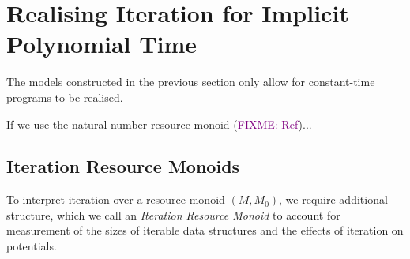 \documentclass[acmsmall,review]{acmart}
\newcommand{\bob}[1]{\textcolor{purple}{FIXME: #1}}
\begin{document}
\section{Realising Iteration for Implicit Polynomial Time}
\label{sec:realising-iteration}

The models constructed in the previous section only allow for
constant-time programs to be realised.

If we use the natural number resource monoid (\bob{Ref})...

\subsection{Iteration Resource Monoids}

To interpret iteration over a resource monoid $(M, M_0)$, we require
additional structure, which we call an \emph{Iteration Resource
  Monoid} to account for measurement of the sizes of iterable data
structures and the effects of iteration on potentials.
\end{document}
